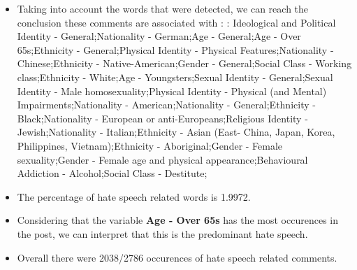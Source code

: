 \documentclass[11pt]{article}
\begin{document}
\begin{itemize}\item Taking into account the words that were detected, we can reach the conclusion these comments are associated with : :  Ideological and Political Identity - General;Nationality - German;Age - General;Age - Over 65s;Ethnicity - General;Physical Identity - Physical Features;Nationality - Chinese;Ethnicity - Native-American;Gender - General;Social Class - Working class;Ethnicity - White;Age - Youngsters;Sexual Identity - General;Sexual Identity - Male homosexuality;Physical Identity - Physical (and Mental) Impairments;Nationality - American;Nationality - General;Ethnicity - Black;Nationality - European or anti-Europeans;Religious Identity - Jewish;Nationality - Italian;Ethnicity - Asian (East- China, Japan, Korea, Philippines, Vietnam);Ethnicity - Aboriginal;Gender - Female sexuality;Gender - Female age and physical appearance;Behavioural Addiction - Alcohol;Social Class - Destitute;%

\item The percentage of hate speech related words is 1.9972.

\item Considering that the variable \textbf{Age - Over 65s} has the most occurences in the post, we can interpret that this is the predominant hate speech.

\item Overall there were 2038/2786 occurences of hate speech related comments.\end{itemize}
\end{document}
